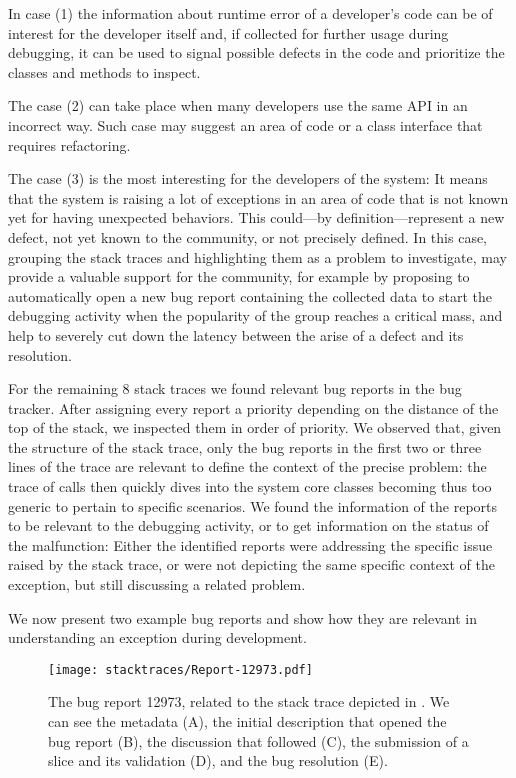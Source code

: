 In case (1) the information about runtime error of a developer's code can be of interest for the developer itself and, if collected for further usage during debugging, it can be used to signal possible defects in the code and prioritize the classes and methods to inspect.

The case (2) can take place when many developers use the same API in an incorrect way.
Such case may suggest an area of code or a class interface that requires refactoring.

The case (3) is the most interesting for the developers of the system: It means that the system is raising a lot of exceptions in an area of code that is not known yet for having unexpected behaviors.
This could---by definition---represent a new defect, not yet known to the community, or not precisely defined.
In this case, grouping the stack traces and highlighting them as a problem to investigate, may provide a valuable support for the community, for example by proposing to automatically open a new bug report containing the collected data to start the debugging activity when the popularity of the group reaches a critical mass, and help to severely cut down the latency between the arise of a defect and its resolution.

For the remaining 8 stack traces we found relevant bug reports in the bug tracker.
After assigning every report a priority depending on the distance of the top of the stack, we inspected them in order of priority.
We observed that, given the structure of the stack trace, only the bug reports in the first two or three lines of the trace are relevant to define the context of the precise problem: the trace of calls then quickly dives into the system core classes becoming thus too generic to pertain to specific scenarios.
We found the information of the reports to be relevant to the debugging activity, or to get information on the status of the malfunction: Either the identified reports were addressing the specific issue raised by the stack trace, or were not depicting the same specific context of the exception, but still discussing a related problem.

We now present two example bug reports and show how they are relevant in understanding an exception during development.


\clearpage
\begin{figure}[!ht]
\begin{center}
  \texttt{[image: stacktraces/Report-12973.pdf]}
  \caption{The bug report 12973, related to the stack trace depicted in .
We can see the metadata (A), the initial description that opened the bug report (B), the discussion that followed (C), the submission of a slice and its validation (D), and the bug resolution (E).}
  \label{fig:report}
\end{center}
\end{figure}

